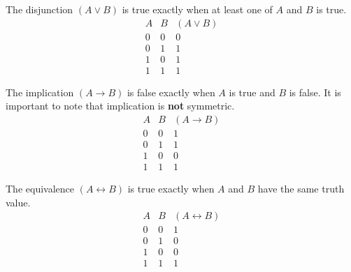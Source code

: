 \documentclass[11pt,a4paper]{amsart}
\begin{document}
\begin{definition}[Disjunction]
  The disjunction \((A\lor B)\) is true exactly when at least one of \(A\) and
  \(B\) is true.
  \[
    \begin{array}{cc|c}
      A & B & (A\lor B) \\
      \hline
      0 & 0 & 0 \\
      0 & 1 & 1 \\
      1 & 0 & 1 \\
      1 & 1 & 1
    \end{array}
  \]
\end{definition}

\begin{definition}[Implication]
  The implication \((A\rightarrow B)\) is false exactly when \(A\) is true and
  \(B\) is false. It is important to note that implication is \textbf{not}
  symmetric.
  \[
    \begin{array}{cc|c}
      A & B & (A\rightarrow B) \\
      \hline
      0 & 0 & 1 \\
      0 & 1 & 1 \\
      1 & 0 & 0 \\
      1 & 1 & 1
    \end{array}
  \]
\end{definition}

\begin{definition}[Equivalence]
  The equivalence \((A\leftrightarrow B)\) is true exactly when \(A\) and \(B\)
  have the same truth value.
  \[
    \begin{array}{cc|c}
      A & B & (A\leftrightarrow B) \\
      \hline
      0 & 0 & 1 \\
      0 & 1 & 0 \\
      1 & 0 & 0 \\
      1 & 1 & 1
    \end{array}
  \]
\end{definition}
\end{document}
